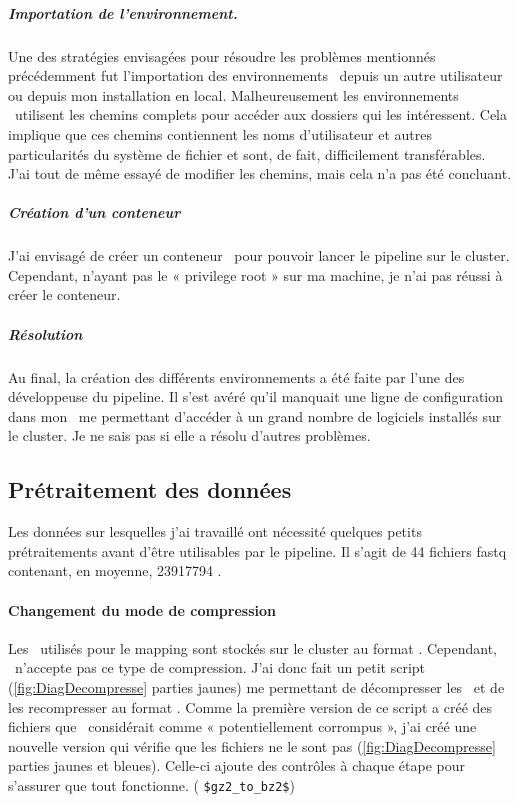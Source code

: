 \documentclass[../main]{subfiles} %
\begin{document}
\subparagraph{Importation de l’environnement.} Une des stratégies envisagées  pour résoudre les problèmes mentionnés précédemment fut l’importation des environnements \Conda depuis un autre utilisateur ou depuis mon installation en local. Malheureusement les environnements \Conda utilisent les chemins complets pour accéder aux dossiers qui les intéressent. Cela implique que ces chemins contiennent les noms d’utilisateur et autres particularités du système de fichier et sont, de fait, difficilement transférables. J’ai tout de même essayé de modifier les chemins, mais cela n’a pas été concluant.

\subparagraph{Création d’un conteneur \Singularity} J’ai envisagé de créer un conteneur \Singularity pour pouvoir lancer le pipeline sur le \gls{cluster}. Cependant, n’ayant pas le « privilege root » sur ma machine, je n’ai pas réussi à créer le conteneur.

\subparagraph{Résolution} Au final, la création des différents environnements a été faite par l’une des développeuse du pipeline. Il s’est avéré qu’il manquait une ligne de configuration dans mon \bashrc me permettant d’accéder à un grand nombre de logiciels installés sur le \gls{cluster}. Je ne sais pas si elle a résolu d’autres problèmes.


\subsection{Prétraitement des données}
Les données sur lesquelles j’ai travaillé ont nécessité quelques petits prétraitements avant d’être utilisables par le pipeline. Il s'agit de 44 fichiers \gls{fastq} contenant, en moyenne, \num{23 917 794} \reads.

\paragraph{Changement du mode de compression}

Les \fastq utilisés pour le \gls{mapping} sont stockés sur le \gls{cluster} au format \bz. Cependant, \GeCKO n’accepte pas ce type de compression. J’ai donc fait un petit script (\cref{fig:DiagDecompresse}  parties jaunes) me permettant de décompresser les \bz et de les recompresser au format \gz. Comme la première version de ce script a créé des fichiers que \GeCKO considérait comme « potentiellement corrompus », j’ai créé une nouvelle version qui vérifie que les fichiers ne le sont pas (\cref{fig:DiagDecompresse} parties jaunes et bleues). Celle-ci ajoute des contrôles à chaque étape pour s’assurer que tout fonctionne.  (\cite{florent_f-marchalm1bioinfointernship2024-inrae_agap_ge2pop_2024} \lstinline{$gz2_to_bz2$})
\end{document}
